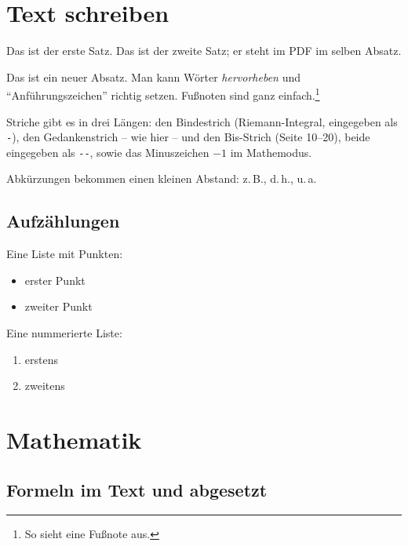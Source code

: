 \section{Text schreiben}\label{sec:text}

Das ist der erste Satz.
Das ist der zweite Satz; er steht im PDF im selben Absatz.

Das ist ein neuer Absatz.
Man kann Wörter \emph{hervorheben} und \enquote{Anführungszeichen} richtig setzen.
Fußnoten sind ganz einfach.\footnote{So sieht eine Fußnote aus.}

Striche gibt es in drei Längen:
den Bindestrich (Riemann-Integral, eingegeben als \verb|-|),
den Gedankenstrich -- wie hier -- und den Bis-Strich (Seite 10--20), beide eingegeben als \verb|--|,
sowie das Minuszeichen $-1$ im Mathemodus.

Abkürzungen bekommen einen kleinen Abstand: z.\,B., d.\,h., u.\,a.

\subsection{Aufzählungen}

Eine Liste mit Punkten:
\begin{itemize}
	\item erster Punkt
	\item zweiter Punkt
\end{itemize}

Eine nummerierte Liste:
\begin{enumerate}
	\item erstens
	\item zweitens
\end{enumerate}

\section{Mathematik}\label{sec:mathe}

\subsection{Formeln im Text und abgesetzt}

